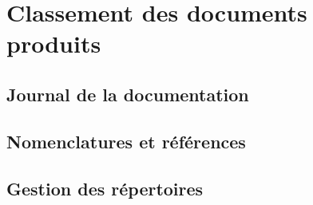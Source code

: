 \section{Classement des documents produits}
\subsection{Journal de la documentation}
\subsection{Nomenclatures et références}
\subsection{Gestion des répertoires}
